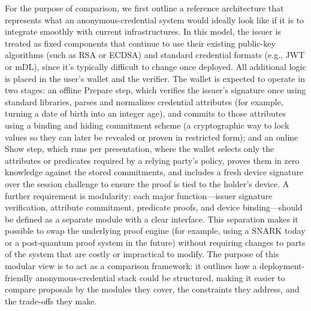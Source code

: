 For the purpose of comparison, we first outline a reference architecture that represents what an anonymous-credential system would ideally look like if it is to integrate smoothly with current infrastructures. In this model, the issuer is treated as fixed components that continue to use their existing public-key algorithms (such as RSA or ECDSA) and standard credential formats (e.g., JWT or mDL), since it's typically difficult to change once deployed. All additional logic is placed in the user’s wallet and the verifier.
The wallet is expected to operate in two stages: an offline Prepare step, which verifies the issuer’s signature once using standard libraries, parses and normalizes credential attributes (for example, turning a date of birth into an integer age), and commits to those attributes using a binding and hiding commitment scheme (a cryptographic way to lock values so they can later be revealed or proven in restricted form); and an online Show step, which runs per presentation, where the wallet selects only the attributes or predicates required by a relying party’s policy, proves them in zero knowledge against the stored commitments, and includes a fresh device signature over the session challenge to ensure the proof is tied to the holder’s device.
A further requirement is modularity: each major function—issuer signature verification, attribute commitment, predicate proofs, and device binding—should be defined as a separate module with a clear interface. This separation makes it possible to swap the underlying proof engine (for example, using a SNARK today or a post-quantum proof system in the future) without requiring changes to parts of the system that are costly or impractical to modify. The purpose of this modular view is to act as a comparison framework: it outlines how a deployment-friendly anonymous-credential stack could be structured, making it easier to compare proposals by the modules they cover, the constraints they address, and the trade-offs they make.


